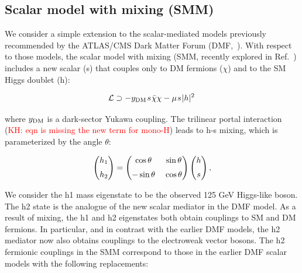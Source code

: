 \subsection{Scalar model with mixing (SMM)} \label{sub:SMM} 
We consider a simple extension to the scalar-mediated models previously recommended by the ATLAS/CMS Dark Matter Forum (DMF,~\cite{Abercrombie:2015wmb}).  With respect to those models, the scalar model with mixing (SMM, recently explored in Ref.~\cite{Bauer:2016gys}) includes a new scalar (s) that couples only to DM fermions ($\chi$) and to the SM Higgs doublet (h): 

\begin{equation} \label{eq:Linteractions}
{\cal L} \supset -y_{\rm DM} \hspace{0.25mm} s \hspace{0.25mm} \bar \chi \chi  - \mu \hspace{0.25mm} s \hspace{0.25mm} |h|^2 \, 
\end{equation}

where $y_{\rm DM}$ is a dark-sector Yukawa coupling. The trilinear portal interaction (\textcolor{red}{KH: eqn is missing the new term for mono-H}) leads to h-s mixing, which is parameterized by the angle $\theta$:  

\begin{equation} \label{eq:mixing}
\begin{pmatrix} h_1 \\[2mm] h_2 \end{pmatrix} = \begin{pmatrix} \cos \theta & \hspace{1mm}   \sin \theta \\[2mm] -\sin \theta & \hspace{1mm} \cos \theta \end{pmatrix} \begin{pmatrix} h \\[2mm] s \end{pmatrix},
\end{equation}

We consider the h1 mass eigenstate to be the observed 125 GeV Higgs-like boson.  The h2 state is the analogue of the new scalar mediator in the DMF model.  As a result of mixing, the h1 and h2 eigenstates both obtain couplings to SM and DM fermions.  In particular, and in contrast with the earlier DMF models, the h2 mediator now also obtains couplings to the electroweak vector bosons.  The h2 fermionic couplings in the SMM correspond to those in the earlier DMF scalar models with the following replacements:    


